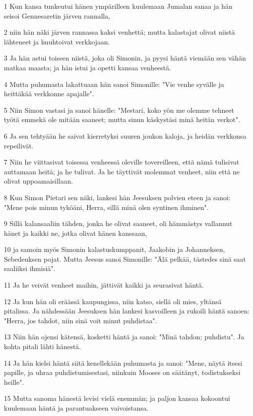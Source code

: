 \par 1 Kun kansa tunkeutui hänen ympärilleen kuulemaan Jumalan sanaa ja hän seisoi Gennesaretin järven rannalla,
\par 2 niin hän näki järven rannassa kaksi venhettä; mutta kalastajat olivat niistä lähteneet ja huuhtoivat verkkojaan.
\par 3 Ja hän astui toiseen niistä, joka oli Simonin, ja pyysi häntä viemään sen vähän matkaa maasta; ja hän istui ja opetti kansaa venheestä.
\par 4 Mutta puhumasta lakattuaan hän sanoi Simonille: "Vie venhe syvälle ja heittäkää verkkonne apajalle".
\par 5 Niin Simon vastasi ja sanoi hänelle: "Mestari, koko yön me olemme tehneet työtä emmekä ole mitään saaneet; mutta sinun käskystäsi minä heitän verkot".
\par 6 Ja sen tehtyään he saivat kierretyksi suuren joukon kaloja, ja heidän verkkonsa repeilivät.
\par 7 Niin he viittasivat toisessa venheessä oleville tovereilleen, että nämä tulisivat auttamaan heitä; ja he tulivat. Ja he täyttivät molemmat venheet, niin että ne olivat uppoamaisillaan.
\par 8 Kun Simon Pietari sen näki, lankesi hän Jeesuksen polvien eteen ja sanoi: "Mene pois minun tyköäni, Herra, sillä minä olen syntinen ihminen".
\par 9 Sillä kalansaaliin tähden, jonka he olivat saaneet, oli hämmästys vallannut hänet ja kaikki ne, jotka olivat hänen kanssaan,
\par 10 ja samoin myös Simonin kalastuskumppanit, Jaakobin ja Johanneksen, Sebedeuksen pojat. Mutta Jeesus sanoi Simonille: "Älä pelkää, tästedes sinä saat saaliiksi ihmisiä".
\par 11 Ja he veivät venheet maihin, jättivät kaikki ja seurasivat häntä.
\par 12 Ja kun hän oli eräässä kaupungissa, niin katso, siellä oli mies, yltänsä pitalissa. Ja nähdessään Jeesuksen hän lankesi kasvoilleen ja rukoili häntä sanoen: "Herra, jos tahdot, niin sinä voit minut puhdistaa".
\par 13 Niin hän ojensi kätensä, kosketti häntä ja sanoi: "Minä tahdon; puhdistu". Ja kohta pitali lähti hänestä.
\par 14 Ja hän kielsi häntä siitä kenellekään puhumasta ja sanoi: "Mene, näytä itsesi papille, ja uhraa puhdistumisestasi, niinkuin Mooses on säätänyt, todistukseksi heille".
\par 15 Mutta sanoma hänestä levisi vielä enemmän; ja paljon kansaa kokoontui kuulemaan häntä ja parantuakseen vaivoistansa.
